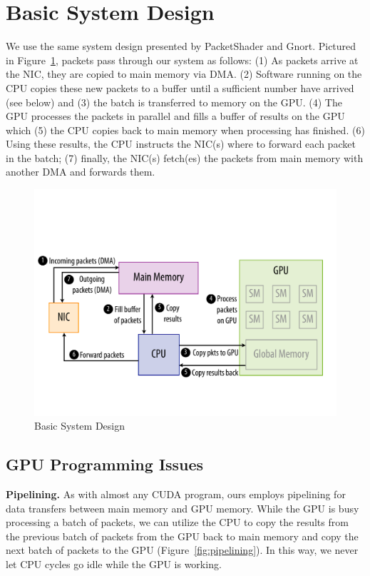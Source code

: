 \section{Basic System Design}
\label{sec:system-design}

We use the same system design presented by PacketShader and Gnort. Pictured in
Figure~\ref{fig:system}, packets pass through our system as follows: (1) As
packets arrive at the NIC, they are copied to main memory via DMA. (2) Software
running on the CPU copies these new packets to a buffer until a sufficient
number have arrived (see below) and (3) the batch is transferred to memory on
the GPU. (4) The GPU processes the packets in parallel and fills a buffer of
results on the GPU which (5) the CPU copies back to main memory when processing
has finished. (6) Using these results, the CPU instructs the NIC(s) where to
forward each packet in the batch; (7) finally, the NIC(s) fetch(es) the packets
from main memory with another DMA and forwards them.

\begin{figure}
   \centering
   \includegraphics[scale=0.23]{figs/system_overview.pdf} 
   \caption{Basic System Design}
   \label{fig:system}
\end{figure}

\subsection{GPU Programming Issues}
\noindent \textbf{Pipelining.} As with almost any CUDA program, ours employs
pipelining for data transfers between main memory and GPU memory. While the GPU
is busy processing a batch of packets, we can utilize the CPU to copy the
results from the previous batch of packets from the GPU back to main memory and
copy the next batch of packets to the GPU (Figure~\ref{fig:pipelining}). In
this way, we never let CPU cycles go idle while the GPU is working.\\


